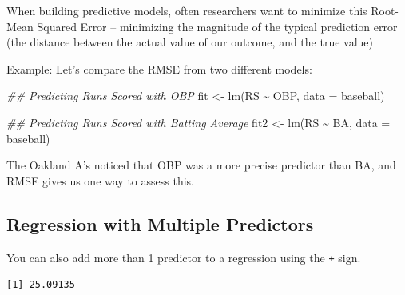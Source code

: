 \documentclass[
  letterpaper,
  DIV=11,
  numbers=noendperiod]{scrreprt}
\newenvironment{Shaded}{\begin{snugshade}}{\end{snugshade}}
\newcommand{\AttributeTok}[1]{\textcolor[rgb]{0.40,0.45,0.13}{#1}}
\newcommand{\DecValTok}[1]{\textcolor[rgb]{0.68,0.00,0.00}{#1}}
\newcommand{\DocumentationTok}[1]{\textcolor[rgb]{0.37,0.37,0.37}{\textit{#1}}}
\newcommand{\FunctionTok}[1]{\textcolor[rgb]{0.28,0.35,0.67}{#1}}
\newcommand{\NormalTok}[1]{\textcolor[rgb]{0.00,0.23,0.31}{#1}}
\newcommand{\OtherTok}[1]{\textcolor[rgb]{0.00,0.23,0.31}{#1}}
\newcommand{\SpecialCharTok}[1]{\textcolor[rgb]{0.37,0.37,0.37}{#1}}
\begin{document}
When building predictive models, often researchers want to minimize this
Root-Mean Squared Error -- minimizing the magnitude of the typical
prediction error (the distance between the actual value of our outcome,
and the true value)

Example: Let's compare the RMSE from two different models:

\begin{Shaded}
\begin{Highlighting}[]
\DocumentationTok{\#\# Predicting Runs Scored with OBP}
\NormalTok{fit }\OtherTok{\textless{}{-}} \FunctionTok{lm}\NormalTok{(RS }\SpecialCharTok{\textasciitilde{}}\NormalTok{ OBP, }\AttributeTok{data =}\NormalTok{ baseball)}

\DocumentationTok{\#\# Predicting Runs Scored with Batting Average}
\NormalTok{fit2 }\OtherTok{\textless{}{-}} \FunctionTok{lm}\NormalTok{(RS }\SpecialCharTok{\textasciitilde{}}\NormalTok{ BA, }\AttributeTok{data =}\NormalTok{ baseball)}
\end{Highlighting}
\end{Shaded}

The Oakland A's noticed that OBP was a more precise predictor than BA,
and RMSE gives us one way to assess this.

\hypertarget{regression-with-multiple-predictors}{%
\subsection{Regression with Multiple
Predictors}\label{regression-with-multiple-predictors}}

You can also add more than 1 predictor to a regression using the
\texttt{+} sign.

\begin{Shaded}
\end{Shaded}

\begin{verbatim}
[1] 25.09135
\end{verbatim}
\end{document}
